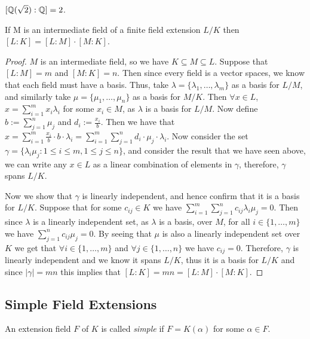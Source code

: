 \begin{example}
	$[\mathbb Q(\sqrt 2): \mathbb Q] = 2$. 
\end{example}
\begin{theorem} \label{thm:tower-theorem}
    If M is an intermediate field of a finite field extension $L/K$ then
$
    [L:K] = [L:M]\cdot[M:K]
$. 
\end{theorem}
\begin{proof}
$M$ is an intermediate field, so we have $K \subseteq M \subseteq L$. Suppose that $[L:M]=m$ and $[M:K]=n$. Then since every field is a vector spaces, we know that each field must have a basis. Thus, take $\lambda = \{\lambda_1,\dots,\lambda_m\}$ as a basis for $L/M$, and similarly take $\mu = \{\mu_1,\dots,\mu_n\}$ as a basis for $M/K$. Then $\forall x \in L$, $x = \sum^m_{i=1}x_i\lambda_i$ for some $x_i \in M$, as $\lambda$ is a basis for $L/M$. Now define $b:=\sum^n_{j=1}\mu_j$ and $d_i:=\frac{x_i}{b}$. Then we have that $x=\sum^m_{i=1}\frac{x_i}{b}\cdot b \cdot \lambda_i = \sum^m_{i=1}\sum^n_{j=1}d_i\cdot \mu_j \cdot \lambda_i$. Now consider the set $\gamma=\{\lambda_i\mu_j : 1\leq i \leq m, 1\leq j \leq n\}$, and consider the result that we have seen above, we can write any $x \in L$ as a linear combination of elements in $\gamma$, therefore, $\gamma$ spans $L/K$.

Now we show that $\gamma$ is linearly independent, and hence confirm that it is a basis for $L/K$. Suppose that for some $c_{ij} \in K$ we have $\sum^m_{i=1} \sum^n_{j=1} c_{ij}\lambda_i\mu_j = 0 $. Then since $\lambda$ is a linearly independent set, as $\lambda$ is a basis, over $M$, for all $i \in \{1,\dots,m\}$ we have $\sum^n_{j=1} c_{ij}\mu_j = 0 $. By seeing that $\mu$ is also a linearly independent set over $K$ we get that $\forall i \in \{1,\dots,m\}$ and $\forall j \in \{1,\dots,n\}$ we have $c_{ij} = 0$. Therefore, $\gamma$ is linearly independent and we  know it spans $L/K$, thus it is a basis for $L/K$ and since $|\gamma|=mn$ this implies that $[L:K] = mn = [L:M]\cdot[M:K]$.
\end{proof}

\subsection{Simple Field Extensions}
\begin{definition}
An extension field \(F\) of \(K\) is called \textit{simple} if \(F = K(\alpha)\) for some \(\alpha \in F\).
\end{definition}

